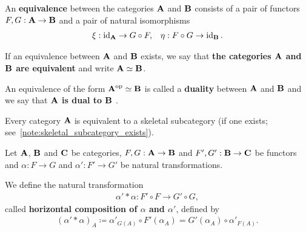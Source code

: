 \begin{definition}\label{def:category_equivalence}\cite[definition 1.3.15]{Leinster2014}
  An \textbf{equivalence} between the categories \( \operatorname{\mathbf{A}} \) and \( \operatorname{\mathbf{B}} \) consists of a pair of functors \( F, G: \operatorname{\mathbf{A}} \to \operatorname{\mathbf{B}} \) and a pair of natural isomorphisms
  \begin{align*}
    \xi: \operatorname{id}_{\operatorname{\mathbf{A}}} \to G \circ F,
    &&
    \eta: F \circ G \to \operatorname{id}_{\operatorname{\mathbf{B}}}.
  \end{align*}

  If an equivalence between \( \operatorname{\mathbf{A}} \) and \( \operatorname{\mathbf{B}} \) exists, we say that \textbf{the categories \( \operatorname{\mathbf{A}} \) and \( \operatorname{\mathbf{B}} \) are equivalent} and write \( \operatorname{\mathbf{A}} \simeq \operatorname{\mathbf{B}} \).

  An equivalence of the form \( \operatorname{\mathbf{A}}^{\operatorname{op}} \simeq \operatorname{\mathbf{B}} \) is called a \textbf{duality} between \( \operatorname{\mathbf{A}} \) and \( \operatorname{\mathbf{B}} \) and we say that \textbf{\( \operatorname{\mathbf{A}} \) is dual to \( \operatorname{\mathbf{B}} \)} \cite[example 1.3.22]{Leinster2014}.
\end{definition}

\begin{proposition}\label{thm:skeletal_subcategory_equivalence}\cite[91]{MacLane1994}
  Every category \( \operatorname{\mathbf{A}} \) is equivalent to a skeletal subcategory (if one exists; see~\cref{note:skeletal_subcategory_exists}).
\end{proposition}

\begin{definition}\label{def:natural_transformation_horizontal_composition}\cite[remarks 1.3.24]{Leinster2014}
  Let \( \operatorname{\mathbf{A}} \), \( \operatorname{\mathbf{B}} \) and \( \operatorname{\mathbf{C}} \) be categories, \( F, G: \operatorname{\mathbf{A}} \to \operatorname{\mathbf{B}} \) and \( F', G': \operatorname{\mathbf{B}} \to \operatorname{\mathbf{C}} \) be functors and \( \alpha: F \to G \) and \( \alpha': F' \to G' \) be natural transformations.
  \begin{Center}
  \end{Center}

  We define the natural transformation
  \begin{align*}
    \alpha' * \alpha: F' \circ F \to G' \circ G,
  \end{align*}
  called \textbf{horizontal composition of \( \alpha \) and \( \alpha' \)}, defined by
  \begin{align*}
    (\alpha' * \alpha)_A \coloneqq \alpha'_{G(A)} \circ F'(\alpha_A) = G'(\alpha_A) \circ \alpha'_{F(A)}.
  \end{align*}
\end{definition}

